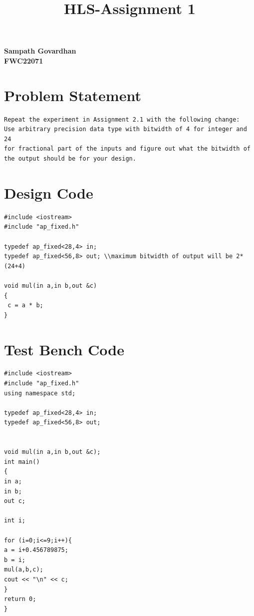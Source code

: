 \documentclass{article}
\title{
HLS-Assignment 1
}
\begin{document}
\maketitle
\hfill \textbf{Sampath Govardhan} \\
\null \hfill \textbf{FWC22071}\\
\tableofcontents
\section{Problem Statement}
\begin{lstlisting}
Repeat the experiment in Assignment 2.1 with the following change:
Use arbitrary precision data type with bitwidth of 4 for integer and 24 
for fractional part of the inputs and figure out what the bitwidth of 
the output should be for your design.
\end{lstlisting}
\vspace{10cm}


\section{Design Code}
\begin{lstlisting}
#include <iostream>
#include "ap_fixed.h"

typedef ap_fixed<28,4> in;
typedef ap_fixed<56,8> out; \\maximum bitwidth of output will be 2*(24+4)

void mul(in a,in b,out &c)
{
 c = a * b;
}

\end{lstlisting}
\vspace{5cm}


\section{Test Bench Code}
\begin{lstlisting}
#include <iostream>
#include "ap_fixed.h"
using namespace std;

typedef ap_fixed<28,4> in;
typedef ap_fixed<56,8> out;


void mul(in a,in b,out &c);
int main()
{
in a;
in b;
out c;

int i;

for (i=0;i<=9;i++){
a = i+0.456789875;
b = i;
mul(a,b,c);
cout << "\n" << c;
}
return 0;
}


\end{lstlisting}
\vspace{5cm}
\end{document}
